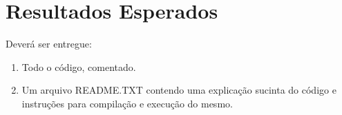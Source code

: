 \documentclass[12pt,brazil, a4paper, fullpage]{article}
\begin{document}
\section{Resultados Esperados}

Deverá ser entregue:

\begin{enumerate}
    \item Todo o código, comentado.

    \item Um arquivo README.TXT contendo uma explicação sucinta do código e instruções para compilação e execução do mesmo.
\end{enumerate}
\end{document}
